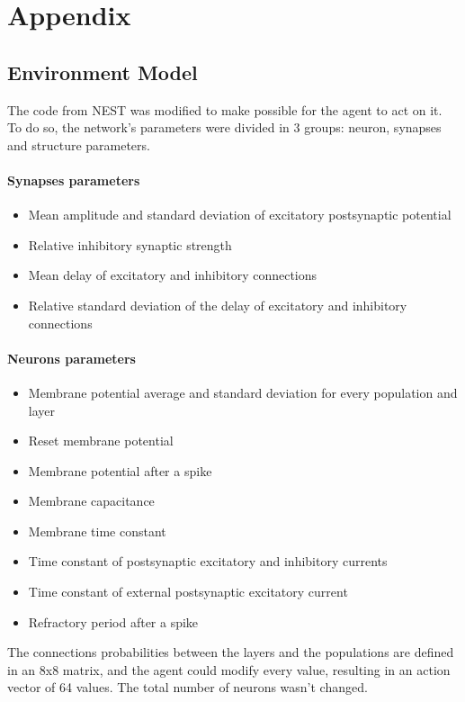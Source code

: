 \section{Appendix}

\subsection{Environment Model} 
\label{appendix_a}
The code from NEST was modified to make possible for the agent to act on it. To do so, the network's parameters were divided in 3 groups: neuron, synapses and structure parameters.
\paragraph{Synapses parameters}
\begin{itemize}[noitemsep]
	\item Mean amplitude and standard deviation of excitatory postsynaptic potential
	\item Relative inhibitory synaptic strength 
	\item Mean delay of excitatory and inhibitory connections
	\item Relative standard deviation of the delay of excitatory and inhibitory connections
\end{itemize}
\paragraph{Neurons parameters}  
\begin{itemize}[noitemsep]
	\item Membrane potential average and standard deviation for every population and layer
	\item Reset membrane potential
	\item Membrane potential after a spike
	\item Membrane capacitance
	\item Membrane time constant
	\item Time constant of postsynaptic excitatory and inhibitory currents
	\item Time constant of external postsynaptic excitatory current
	\item Refractory period after a spike
\end{itemize}
The connections probabilities between the layers and the populations are defined in an 8x8 matrix, and the agent could modify every value, resulting in an action vector of 64 values.
The total number of neurons wasn't changed.




